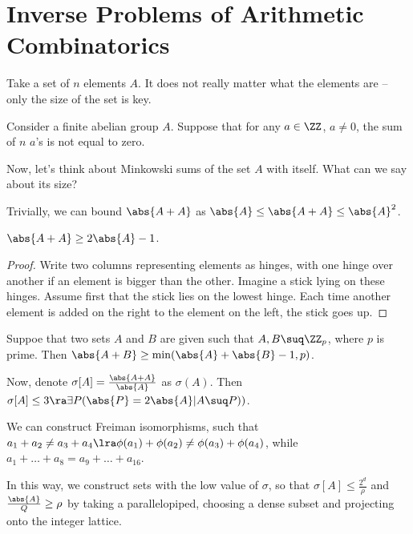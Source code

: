 \documentclass[11pt]{scrartcl}
\begin{document}
  \section{Inverse Problems of Arithmetic Combinatorics}

  Take a set of $n$ elements $A$. It does not really matter what the
  elements are -- only the size of the set is key.

  Consider a finite abelian group $A$. Suppose that for any $a\in \ZZ$,
  $a\neq 0$, the sum of $n$ $a$'s is not equal to zero.

  Now, let's think about Minkowski sums of the set $A$ with itself.
  What can we say about its size?

  Trivially, we can bound $\abs{A+A}$ as
  $\abs{A} \leq \abs{A+A} \leq \abs{A}^{2}$.

  \begin{theorem}
    $\abs{A+A} \geq 2 \abs{A} - 1$.
  \end{theorem}

  \begin{proof}
    \hfill

    Write two columns representing elements as hinges, with one hinge
    over another if an element is bigger than the other. Imagine a
    stick lying on these hinges. Assume first that the stick lies on
    the lowest hinge. Each time another element is added on the right
    to the element on the left, the stick goes up.

  \end{proof}

  \begin{theorem}
    Suppoe that two sets $A$ and $B$ are given such that
    $A, B \suq \ZZ_{p}$, where $p$ is prime. Then
    $\abs{A+B} \geq \min(\abs{A} + \abs{B} - 1, p)$.
  \end{theorem}

  Now, denote $\sigma[A] = \frac{\abs{A+A}}{\abs{A}}$ as $\sigma(A)$.
  Then
  $\sigma[A] \leq 3 \ra \exists P (\abs{P} = 2 \abs{A} | A \suq P))$.

  We can construct Freiman isomorphisms, such that
  $a_{1} + a_{2} \neq a_{3} + a_{4} \lra \phi(a_{1}) + \phi(a_{2})
  \neq \phi(a_{3}) + \phi(a_{4})$, while
  $a_{1} + \dots + a_{8} = a_{9} + \dots + a_{16}$.

  In this way, we construct sets with the low value of $\sigma$, so
  that $\sigma[A] \leq \frac{2^{d}}{\rho}$ and
  $\frac{\abs{A}}{Q} \geq \rho$ by taking a parallelopiped, choosing a
  dense subset and projecting onto the integer lattice.
\end{document}
